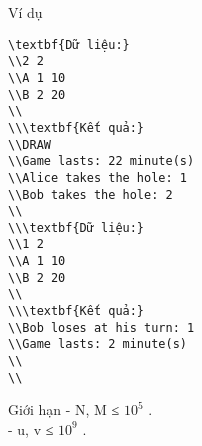 Ví dụ  
\begin{verbatim}
\textbf{Dữ liệu:}
\\2 2
\\A 1 10
\\B 2 20
\\
\\\textbf{Kết quả:}
\\DRAW
\\Game lasts: 22 minute(s)
\\Alice takes the hole: 1
\\Bob takes the hole: 2
\\
\\\textbf{Dữ liệu:}
\\1 2
\\A 1 10
\\B 2 20
\\
\\\textbf{Kết quả:}
\\Bob loses at his turn: 1
\\Game lasts: 2 minute(s)
\\
\\\end{verbatim}
   Giới hạn  
- N, M ≤ $10^{5}$   .   
\\   - u, v ≤ $10^{9}$   .